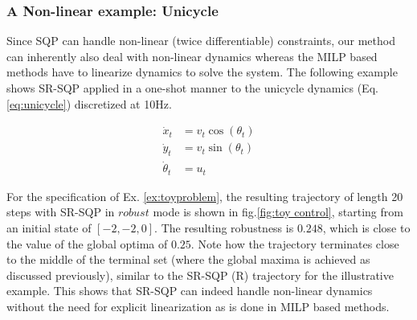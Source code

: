 \subsubsection{A Non-linear example: Unicycle}
\label{sec:nl_unicycle}
Since SQP can handle non-linear (twice differentiable) constraints, our method can inherently also deal with non-linear dynamics whereas the MILP based methods have to linearize dynamics to solve the system. The following example shows SR-SQP applied in a one-shot manner to the unicycle dynamics (Eq. \ref{eq:unicycle}) discretized at 10Hz.

\begin{subequations}
\label{eq:unicycle}
\begin{align}
\dot{x}_t &=v_t \cos (\theta_t) \nonumber \\ 
\dot{y}_t &=v_t \sin (\theta_t) \nonumber \\
\dot{\theta}_t &= u_t
\end{align}
\end{subequations}

For the specification of Ex. \ref{ex:toyproblem}, the resulting trajectory of length 20 steps with SR-SQP in $\textit{robust}$ mode is shown in fig.\ref{fig:toy control}, starting from an initial state of $[-2,-2,0]$. The resulting robustness is $0.248$, which is close to the value of the global optima of $0.25$. Note how the trajectory terminates close to the middle of the terminal set (where the global maxima is achieved as discussed previously), similar to the SR-SQP (R) trajectory for the illustrative example. This shows that SR-SQP can indeed handle non-linear dynamics without the need for explicit linearization as is done in MILP based methods.
